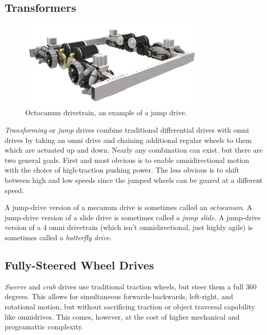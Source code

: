 \subsection{Transformers}

\begin{figure}[H]
	\includegraphics[width=0.8\textwidth]{imgs/drivetrain_octocanum.png}
	\caption{Octocanum drivetrain, an example of a jump drive.}
\end{figure}

\textit{Transforming} or \textit{jump} drives combine traditional differential drives with omni drives by taking an omni drive and chaining additional regular wheels to them which are actuated up and down. Nearly any combination can exist. but there are two general goals. First and most obvious is to enable omnidirectional motion with the choice of high-traction pushing power. The less obvious is to shift between high and low speeds since the jumped wheels can be geared at a different speed.

A jump-drive version of a mecanum drive is sometimes called an \textit{octocanum}. A jump-drive version of a slide drive is sometimes called a \textit{jump slide}. A jump-drive version of a 4 omni drivetrain (which isn't omnidirectional, just highly agile) is sometimes called a \textit{butterfly drive}.

\subsection{Fully-Steered Wheel Drives}

\textit{Swerve} and \textit{crab} drives use traditional traction wheels, but steer them a full 360 degrees. This allows for simultaneous forwards-backwards, left-right, and rotational motion, but without sacrificing traction or object traversal capability like omnidrives. This comes, however, at the cost of higher mechanical and programattic complexity.

